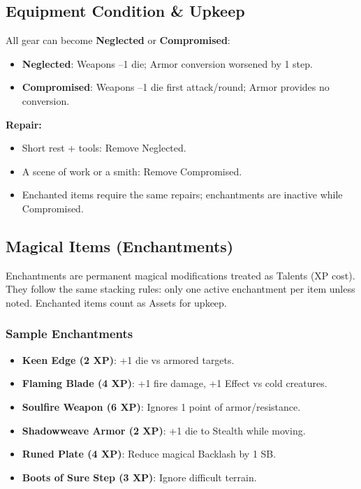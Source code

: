 \subsection{Equipment Condition \& Upkeep}

All gear can become \textbf{Neglected} or \textbf{Compromised}:
\begin{itemize}
  \item \textbf{Neglected}: Weapons –1 die; Armor conversion worsened by 1 step.
  \item \textbf{Compromised}: Weapons –1 die first attack/round; Armor provides no conversion.
\end{itemize}
\textbf{Repair:}
\begin{itemize}
  \item Short rest + tools: Remove Neglected.
  \item A scene of work or a smith: Remove Compromised.
  \item Enchanted items require the same repairs; enchantments are inactive while Compromised.
\end{itemize}

\subsection{Magical Items (Enchantments)}

Enchantments are permanent magical modifications treated as Talents (XP cost). They follow the same stacking rules: only one active enchantment per item unless noted. Enchanted items count as Assets for upkeep.

\subsubsection*{Sample Enchantments}
\begin{itemize}
  \item \textbf{Keen Edge (2 XP)}: +1 die vs armored targets.
  \item \textbf{Flaming Blade (4 XP)}: +1 fire damage, +1 Effect vs cold creatures.
  \item \textbf{Soulfire Weapon (6 XP)}: Ignores 1 point of armor/resistance.
  \item \textbf{Shadowweave Armor (2 XP)}: +1 die to Stealth while moving.
  \item \textbf{Runed Plate (4 XP)}: Reduce magical Backlash by 1 SB.
  \item \textbf{Boots of Sure Step (3 XP)}: Ignore difficult terrain.
\end{itemize}

